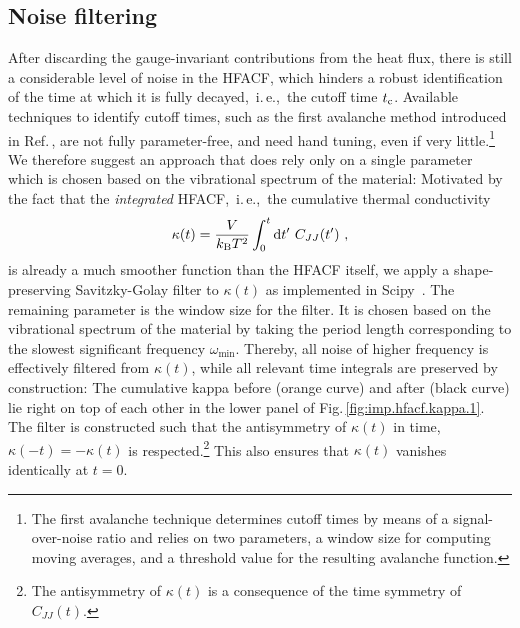 \subsection{Noise filtering}
After discarding the gauge-invariant contributions from the heat flux, there is still a considerable level of noise in the HFACF, which hinders a robust identification of the time at which it is fully decayed,~i.\,e.,~the cutoff time $t_{\rm c}$. Available techniques to identify cutoff times, such as the first avalanche method introduced in Ref.\,\cite{Chen.2010}, are not fully parameter-free, and need hand tuning, even if very little.\footnote{The first avalanche technique determines cutoff times by means of a signal-over-noise ratio and relies on two parameters, a window size for computing moving averages, and a threshold value for the resulting avalanche function.} We therefore suggest an approach that does rely only on a single parameter which is chosen based on the vibrational spectrum of the material: Motivated by the fact that the \emph{integrated} HFACF,~i.\,e.,~the cumulative thermal conductivity
\begin{align}
	\kappa (t)
		=
		\frac{V}{k_{\rm B} T^2} 
		\int_{0}^{t} 
		\d t' ~ C_{JJ} (t')~,
	\label{eq:imp.kappa.cum}
\end{align}
is already a much smoother function than the HFACF itself, we apply a shape-preserving Savitzky-Golay filter to $\kappa (t)$ as implemented in Scipy~\cite{Savitzky.1964,scipy}. The remaining parameter is the window size for the filter. It is chosen based on the vibrational spectrum of the material by taking the period length corresponding to the slowest significant frequency $\omega_{\min}$. Thereby, all noise of higher frequency is effectively filtered from $\kappa (t)$, while all relevant time integrals are preserved by construction: The cumulative kappa before (orange curve) and after (black curve) lie right on top of each other in the lower panel of Fig.\,\ref{fig:imp.hfacf.kappa.1}. The filter is constructed such that the antisymmetry of $\kappa (t)$ in time, $\kappa (-t) = - \kappa (t)$ is respected.\footnote{The antisymmetry of $\kappa (t)$ is a consequence of the time symmetry of $C_{JJ} (t)$.} This also ensures that $\kappa (t)$ vanishes identically at $t=0$.

